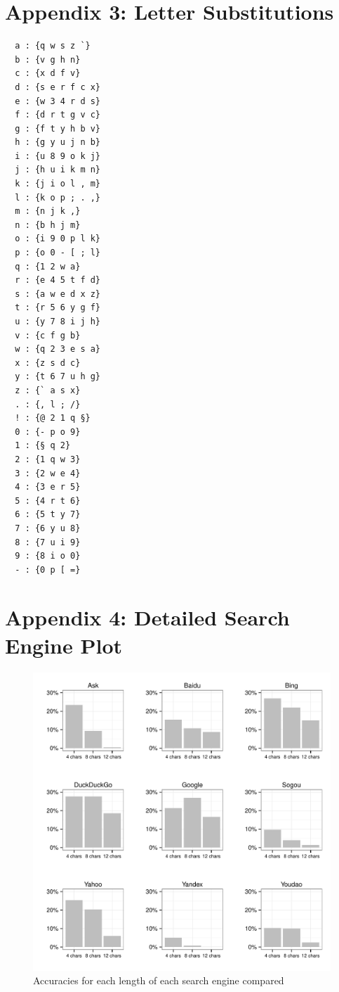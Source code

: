 \documentclass{csfourzero}
\begin{document}
\section{Appendix 3: Letter Substitutions}
\begin{multicols}{2}
  \begin{verbatim}
  a : {q w s z `}
  b : {v g h n}
  c : {x d f v}
  d : {s e r f c x}
  e : {w 3 4 r d s}
  f : {d r t g v c}
  g : {f t y h b v}
  h : {g y u j n b}
  i : {u 8 9 o k j}
  j : {h u i k m n}
  k : {j i o l , m}
  l : {k o p ; . ,}
  m : {n j k ,}
  n : {b h j m}
  o : {i 9 0 p l k}
  p : {o 0 - [ ; l}
  q : {1 2 w a}
  r : {e 4 5 t f d}
  s : {a w e d x z}
  t : {r 5 6 y g f}
  u : {y 7 8 i j h}
  v : {c f g b}
  w : {q 2 3 e s a}
  x : {z s d c}
  y : {t 6 7 u h g}
  z : {` a s x}
  . : {, l ; /}
  ! : {@ 2 1 q §}
  0 : {- p o 9}
  1 : {§ q 2}
  2 : {1 q w 3}
  3 : {2 w e 4}
  4 : {3 e r 5}
  5 : {4 r t 6}
  6 : {5 t y 7}
  7 : {6 y u 8}
  8 : {7 u i 9}
  9 : {8 i o 0}
  - : {0 p [ =}
  \end{verbatim}
\end{multicols}


\pagebreak
\section{Appendix 4: Detailed Search Engine Plot}
\begin{figure}[H]
  \centerline{\includegraphics[width=\textwidth]{eng_vs_acc_9_way}}
  \caption{Accuracies for each length of each search engine compared}\label{fig:9searchengines}
\end{figure}
\end{document}
